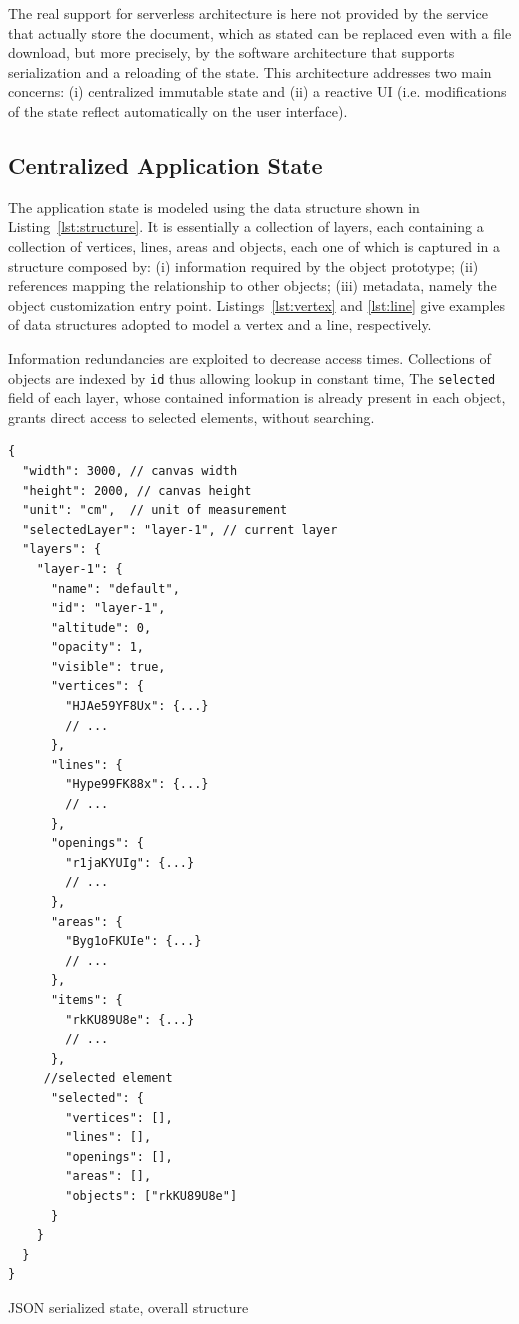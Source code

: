 The real support for serverless architecture is here not provided by the service that actually store the document, which as stated can be replaced even with a file download, but more precisely, by the software architecture that supports serialization and a reloading of the state. This architecture addresses two main concerns: (i) centralized immutable state and (ii) a reactive UI (i.e. modifications of the state reflect automatically on the user interface).

\subsection{Centralized Application State}\label{ssub:centr_state}

The application state is modeled using the data structure shown in Listing~\ref{lst:structure}. It is essentially a collection of layers, each containing a collection of vertices, lines, areas and objects, each one of which is captured in a structure composed by: (i) information required by the object prototype; (ii) references mapping the relationship to other objects; (iii) metadata, namely the object customization entry point. Listings~\ref{lst:vertex} and \ref{lst:line} give examples of data structures adopted to model a vertex and a line, respectively. 

Information redundancies are exploited to decrease access times. Collections of objects are indexed by \texttt{id} thus allowing lookup in constant time, The \texttt{selected} field of each layer, whose contained information is already present in each object,  grants direct access to selected elements, without searching.

\begin{listing}
\begin{verbatim}
{
  "width": 3000, // canvas width
  "height": 2000, // canvas height
  "unit": "cm",  // unit of measurement
  "selectedLayer": "layer-1", // current layer
  "layers": {
    "layer-1": {
      "name": "default",
      "id": "layer-1",
      "altitude": 0,
      "opacity": 1,
      "visible": true,
      "vertices": {
        "HJAe59YF8Ux": {...}
        // ...
      },
      "lines": {
        "Hype99FK88x": {...}
        // ...
      },
      "openings": {
        "r1jaKYUIg": {...}
        // ...
      },
      "areas": {
        "Byg1oFKUIe": {...}
        // ...
      },
      "items": {
        "rkKU89U8e": {...}
        // ...
      },
     //selected element
      "selected": {
        "vertices": [],
        "lines": [],
        "openings": [],
        "areas": [],
        "objects": ["rkKU89U8e"]
      }
    }
  }
}
\end{verbatim}
\caption{JSON serialized state, overall structure} 
\label{lst:structure}
\end{listing}

